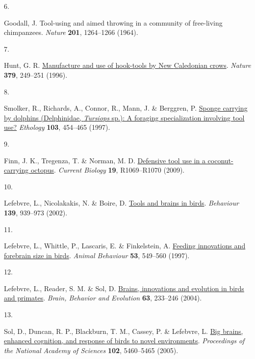 \documentclass[
  man,floatsintext]{apa6}
\newlength{\cslhangindent}
\newlength{\csllabelwidth}
\newlength{\cslentryspacingunit} %
\newenvironment{CSLReferences}[2] %
 {%
  \setlength{\parindent}{0pt}
  \ifodd #1
  \let\oldpar\par
  \def\par{\hangindent=\cslhangindent\oldpar}
  \fi
  \setlength{\parskip}{#2\cslentryspacingunit}
 }%
 {}
\newcommand{\CSLLeftMargin}[1]{\parbox[t]{\csllabelwidth}{#1}}
\newcommand{\CSLRightInline}[1]{\parbox[t]{\linewidth - \csllabelwidth}{#1}\break}
\begin{document}
\begin{CSLReferences}{0}{0}
\leavevmode{}%
\CSLLeftMargin{6. }%
\CSLRightInline{Goodall, J. Tool-using and aimed throwing in a community of free-living chimpanzees. \emph{Nature} \textbf{201}, 1264--1266 (1964).}

\leavevmode{}%
\CSLLeftMargin{7. }%
\CSLRightInline{Hunt, G. R. \href{https://doi.org/10.1038/379249a0}{Manufacture and use of hook-tools by {N}ew {C}aledonian crows}. \emph{Nature} \textbf{379}, 249--251 (1996).}

\leavevmode{}%
\CSLLeftMargin{8. }%
\CSLRightInline{Smolker, R., Richards, A., Connor, R., Mann, J. \& Berggren, P. \href{https://doi.org/10.1111/j.1439-0310.1997.tb00160.x}{Sponge carrying by dolphins ({D}elphinidae, \emph{{T}ursiops} sp.): A foraging specialization involving tool use?} \emph{Ethology} \textbf{103}, 454--465 (1997).}

\leavevmode{}%
\CSLLeftMargin{9. }%
\CSLRightInline{Finn, J. K., Tregenza, T. \& Norman, M. D. \href{https://doi.org/10.1016/j.cub.2009.10.052}{Defensive tool use in a coconut-carrying octopus}. \emph{Current Biology} \textbf{19}, R1069--R1070 (2009).}

\leavevmode{}%
\CSLLeftMargin{10. }%
\CSLRightInline{Lefebvre, L., Nicolakakis, N. \& Boire, D. \href{https://doi.org/10.1163/156853902320387918}{Tools and brains in birds}. \emph{Behaviour} \textbf{139}, 939--973 (2002).}

\leavevmode{}%
\CSLLeftMargin{11. }%
\CSLRightInline{Lefebvre, L., Whittle, P., Lascaris, E. \& Finkelstein, A. \href{https://doi.org/10.1006/anbe.1996.0330}{Feeding innovations and forebrain size in birds}. \emph{Animal Behaviour} \textbf{53}, 549--560 (1997).}

\leavevmode{}%
\CSLLeftMargin{12. }%
\CSLRightInline{Lefebvre, L., Reader, S. M. \& Sol, D. \href{https://doi.org/10.1159/000076784}{Brains, innovations and evolution in birds and primates}. \emph{Brain, Behavior and Evolution} \textbf{63}, 233--246 (2004).}

\leavevmode{}%
\CSLLeftMargin{13. }%
\CSLRightInline{Sol, D., Duncan, R. P., Blackburn, T. M., Cassey, P. \& Lefebvre, L. \href{https://doi.org/10.1073/pnas.0408145102}{Big brains, enhanced cognition, and response of birds to novel environments}. \emph{Proceedings of the National Academy of Sciences} \textbf{102}, 5460--5465 (2005).}


\end{CSLReferences}
\end{document}
